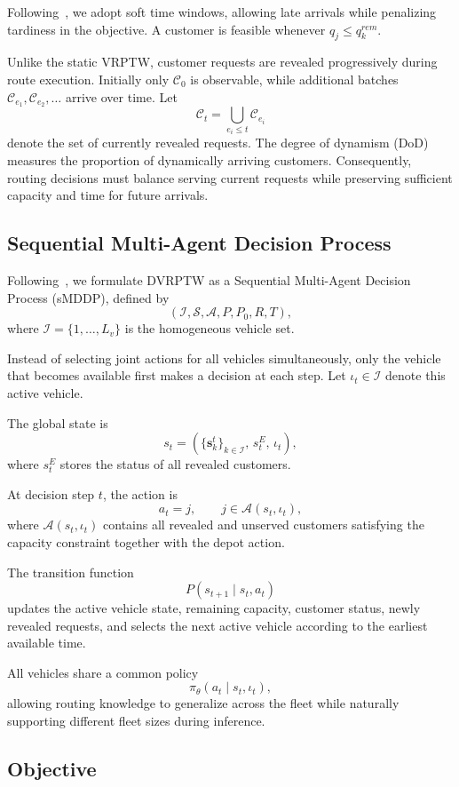 \documentclass[conference]{IEEEtran}
\begin{document}
Following~\cite{TAM2026114234}, we adopt soft time windows, allowing late arrivals
while penalizing tardiness in the objective. A customer is feasible whenever
$q_j\le q_k^{rem}$.

Unlike the static VRPTW, customer requests are revealed progressively during route
execution. Initially only $\mathcal{C}_0$ is observable, while additional batches
$\mathcal{C}_{e_1},\mathcal{C}_{e_2},\ldots$ arrive over time. Let
\[
\mathcal{C}_t=\bigcup_{e_i\le t}\mathcal{C}_{e_i}
\]
denote the set of currently revealed requests. The degree of dynamism (DoD)
measures the proportion of dynamically arriving customers. Consequently, routing
decisions must balance serving current requests while preserving sufficient
capacity and time for future arrivals.

\subsection{Sequential Multi-Agent Decision Process}
\label{sec:prob_mdp}

Following~\cite{TAM2026114234}, we formulate DVRPTW as a Sequential Multi-Agent
Decision Process (sMDDP), defined by
\[
(\mathcal I,\mathcal S,\mathcal A,P,P_0,R,T),
\]
where $\mathcal I=\{1,\ldots,L_v\}$ is the homogeneous vehicle set.

Instead of selecting joint actions for all vehicles simultaneously, only the
vehicle that becomes available first makes a decision at each step. Let
$\iota_t\in\mathcal I$ denote this active vehicle.

The global state is
\[
s_t=(\{\mathbf{s}_k^t\}_{k\in\mathcal I},\,s_t^E,\,\iota_t),
\]
where $s_t^E$ stores the status of all revealed customers.

At decision step $t$, the action is
\[
a_t=j,\qquad
j\in\mathcal A(s_t,\iota_t),
\]
where $\mathcal A(s_t,\iota_t)$ contains all revealed and unserved customers
satisfying the capacity constraint together with the depot action.

The transition function
\[
P(s_{t+1}\mid s_t,a_t)
\]
updates the active vehicle state, remaining capacity, customer status, newly
revealed requests, and selects the next active vehicle according to the earliest
available time.

All vehicles share a common policy
\[
\pi_\theta(a_t\mid s_t,\iota_t),
\]
allowing routing knowledge to generalize across the fleet while naturally
supporting different fleet sizes during inference.

\subsection{Objective}
\label{sec:prob_obj}
\end{document}
